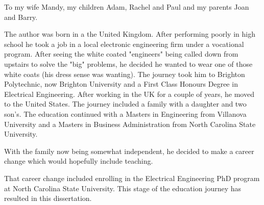 \maketitlepage

\begin{dedication}
 \centering To my wife Mandy, my children Adam, Rachel and Paul and my parents Joan and Barry.
\end{dedication}

\begin{biography}
The author was born in a the United Kingdom.  After performing poorly in high school he took a job in a local electronic engineering firm
under a vocational program.
After seeing the white coated "engineers" being called down from upstairs to solve the "big" problems, he decided he wanted to wear one
of those white coats (his dress sense was wanting).
The journey took him to Brighton Polytechnic, now Brighton University and a First Class Honours Degree in Electrical Engineering.
After working in the UK for a couple of years, he moved to the United States.
The journey included a family with a daughter and two son's.
The education continued with a Masters in Engineering from Villanova University and a Masters in Business Administration from North
Carolina State University.

With the family now being somewhat independent, he decided to make a career change which would hopefully include teaching.

That career change included enrolling in the Electrical Engineering PhD program at North
Carolina State University. This stage of the education journey has resulted in this dissertation.




\end{biography}
